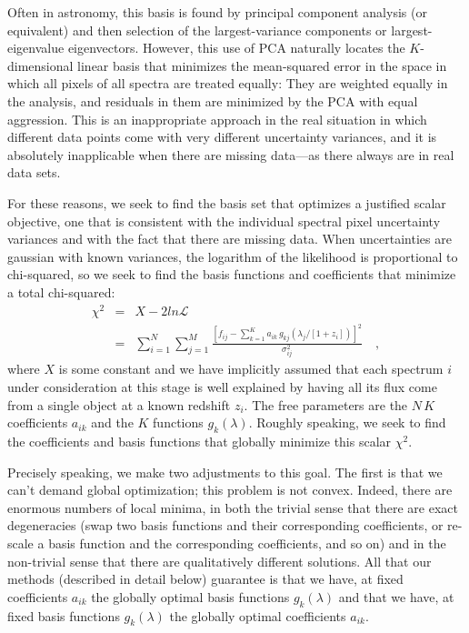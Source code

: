 \documentclass[apj]{emulateapj}
\begin{document}
Often in astronomy, this basis is found by principal component analysis (or equivalent) and then selection of the largest-variance
components or largest-eigenvalue eigenvectors.  However, this use of PCA naturally locates the $K$-dimensional linear basis that minimizes the mean-squared error in the space in which all pixels of all spectra are treated equally: They are weighted equally in the analysis, and residuals in them are minimized by the PCA with equal aggression. This is an inappropriate approach in the real situation in which different data points come with very different uncertainty variances, and it is absolutely inapplicable when there are missing data---as there always are in real data sets.

For these reasons, we seek to find the basis set that optimizes a justified scalar objective, one that is consistent with the individual spectral pixel uncertainty variances and with the fact that there are missing data.  When uncertainties are gaussian with known variances, the logarithm of the likelihood is proportional to chi-squared, so we seek to find the basis functions and coefficients that minimize a total chi-squared:
\begin{eqnarray}\label{e4}\displaystyle
\chi^2 & = & X - 2ln\mathcal{L} \nonumber\\
 & = & \sum_{i=1}^N \sum_{j=1}^M
\frac{\left[f_{ij}-\sum_{k=1}^K a_{ik}
                      \,g_{kj}(\lambda_j/[1+z_i])\right]^2}
{\sigma^2_{ij}}
\quad ,
\end{eqnarray}
where $X$ is some constant and we have implicitly assumed that each spectrum $i$ under consideration at this stage is well explained by having all its flux come from a single object at a known redshift $z_i$. The free parameters are the $N\,K$ coefficients $a_{ik}$ and the $K$ functions $g_k(\lambda)$. Roughly speaking, we seek to find the coefficients and basis functions that globally minimize this scalar $\chi^2$.

Precisely speaking, we make two adjustments to this goal. The first is that we can't demand global optimization; this problem is not
convex.  Indeed, there are enormous numbers of local minima, in both the trivial sense that there are exact degeneracies (swap two basis functions and their corresponding coefficients, or re-scale a basis function and the corresponding coefficients, and so on) and in the non-trivial sense that there are qualitatively different solutions. All that our methods (described in detail below) guarantee is that we have, at fixed coefficients $a_{ik}$ the globally optimal basis functions $g_k(\lambda)$ and that we have, at fixed basis functions $g_k(\lambda)$ the globally optimal coefficients $a_{ik}$.
\end{document}

